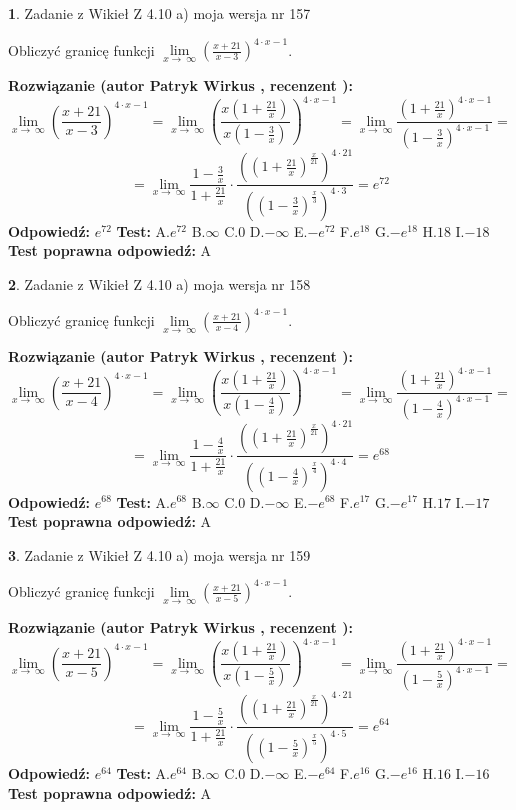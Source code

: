 \documentclass[12pt, a4paper]{article}
\theoremstyle{definition} %
\newtheorem{zad}{}
\newcommand{\zadStart}[1]{\begin{zad}#1\newline}
\newcommand{\zadStop}{\end{zad}}
\newcommand{\rozwStart}[2]{\noindent \textbf{Rozwiązanie (autor #1 , recenzent #2): }\newline}
\newcommand{\rozwStop}{\newline}
\newcommand{\odpStart}{\noindent \textbf{Odpowiedź:}\newline}
\newcommand{\odpStop}{\newline}
\newcommand{\testStart}{\noindent \textbf{Test:}\newline}
\newcommand{\testStop}{\newline}
\newcommand{\kluczStart}{\noindent \textbf{Test poprawna odpowiedź:}\newline}
\newcommand{\kluczStop}{\newline}
\begin{document}
\zadStart{Zadanie z Wikieł Z 4.10 a) moja wersja nr 157}

Obliczyć granicę funkcji  $\lim\limits_{x\to\ \infty}(\frac{x+21}{x-3})^{4\cdot x-1}$.
\zadStop
\rozwStart{Patryk Wirkus}{}
$$\lim\limits_{x\to\ \infty}(\frac{x+21}{x-3})^{4\cdot x-1} = \lim\limits_{x\to\ \infty}(\frac{x(1+\frac{21}{x})}{x(1-\frac{3}{x})})^{4\cdot x-1}=\lim\limits_{x\to\ \infty}\frac{(1+\frac{21}{x})^{4\cdot x-1}}{(1-\frac{3}{x})^{4\cdot x-1}}=$$
$$=\lim\limits_{x\to\ \infty}\frac{1-\frac{3}{x}}{1+\frac{21}{x}}\cdot\frac{((1+\frac{21}{x})^{\frac{x}{21}})^{4\cdot21}}{((1-\frac{3}{x})^{\frac{x}{3}})^{4\cdot3}}=e^{72}$$
\rozwStop
\odpStart
$e^{72}$
\odpStop
\testStart
A.$e^{72}$ B.$\infty$ C.$0$ D.$-\infty$ E.$-e^{72}$
F.$e^{18}$ G.$-e^{18}$
H.$18$
I.$-18$
\testStop
\kluczStart
A
\kluczStop



\zadStart{Zadanie z Wikieł Z 4.10 a) moja wersja nr 158}

Obliczyć granicę funkcji  $\lim\limits_{x\to\ \infty}(\frac{x+21}{x-4})^{4\cdot x-1}$.
\zadStop
\rozwStart{Patryk Wirkus}{}
$$\lim\limits_{x\to\ \infty}(\frac{x+21}{x-4})^{4\cdot x-1} = \lim\limits_{x\to\ \infty}(\frac{x(1+\frac{21}{x})}{x(1-\frac{4}{x})})^{4\cdot x-1}=\lim\limits_{x\to\ \infty}\frac{(1+\frac{21}{x})^{4\cdot x-1}}{(1-\frac{4}{x})^{4\cdot x-1}}=$$
$$=\lim\limits_{x\to\ \infty}\frac{1-\frac{4}{x}}{1+\frac{21}{x}}\cdot\frac{((1+\frac{21}{x})^{\frac{x}{21}})^{4\cdot21}}{((1-\frac{4}{x})^{\frac{x}{4}})^{4\cdot4}}=e^{68}$$
\rozwStop
\odpStart
$e^{68}$
\odpStop
\testStart
A.$e^{68}$ B.$\infty$ C.$0$ D.$-\infty$ E.$-e^{68}$
F.$e^{17}$ G.$-e^{17}$
H.$17$
I.$-17$
\testStop
\kluczStart
A
\kluczStop



\zadStart{Zadanie z Wikieł Z 4.10 a) moja wersja nr 159}

Obliczyć granicę funkcji  $\lim\limits_{x\to\ \infty}(\frac{x+21}{x-5})^{4\cdot x-1}$.
\zadStop
\rozwStart{Patryk Wirkus}{}
$$\lim\limits_{x\to\ \infty}(\frac{x+21}{x-5})^{4\cdot x-1} = \lim\limits_{x\to\ \infty}(\frac{x(1+\frac{21}{x})}{x(1-\frac{5}{x})})^{4\cdot x-1}=\lim\limits_{x\to\ \infty}\frac{(1+\frac{21}{x})^{4\cdot x-1}}{(1-\frac{5}{x})^{4\cdot x-1}}=$$
$$=\lim\limits_{x\to\ \infty}\frac{1-\frac{5}{x}}{1+\frac{21}{x}}\cdot\frac{((1+\frac{21}{x})^{\frac{x}{21}})^{4\cdot21}}{((1-\frac{5}{x})^{\frac{x}{5}})^{4\cdot5}}=e^{64}$$
\rozwStop
\odpStart
$e^{64}$
\odpStop
\testStart
A.$e^{64}$ B.$\infty$ C.$0$ D.$-\infty$ E.$-e^{64}$
F.$e^{16}$ G.$-e^{16}$
H.$16$
I.$-16$
\testStop
\kluczStart
A
\kluczStop
\end{document}

